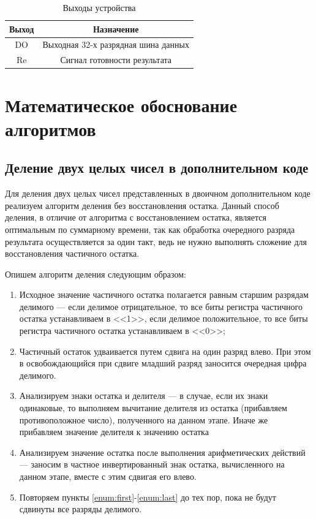\documentclass[a4paper,14pt]{extarticle}
\begin{document}
\begin{table}[h!]
	\centering
	\begin{tabular}{|c|c|}
		\hline
		\multicolumn{1}{|c|}{\textbf{Выход}} & \multicolumn{1}{c|}{\textbf{Назначение}} \\ \hline
		DO & Выходная 32-х разрядная шина данных \\ \hline
		Re & Сигнал готовности результата \\ \hline
	\end{tabular}
	\caption{Выходы устройства}
	\label{tab:outputs}

\end{table} 


\section{Математическое обоснование алгоритмов}
\subsection{Деление двух целых чисел в дополнительном коде}
Для деления двух целых чисел представленных в двоичном дополнительном коде реализуем алгоритм деления без восстановления остатка. Данный способ деления, в отличие от алгоритма с восстановлением остатка, является оптимальным по суммарному времени, так как обработка очередного разряда результата осуществляется за один такт, ведь не нужно выполнять сложение для восстановления частичного остатка.

Опишем алгоритм деления следующим образом:
\begin{enumerate}
	\item \label{enum:first} Исходное значение частичного остатка полагается равным старшим разрядам делимого --- если делимое отрицательное, то все биты регистра частичного остатка устанавливаем в <<1>>, если делимое положительное, то все биты регистра частичного остатка устанавливаем в <<0>>;
	\item Частичный остаток удваивается путем сдвига на один разряд влево. При этом в освобождающийся при сдвиге младший разряд заносится очередная цифра делимого.
	\item Анализируем знаки остатка и делителя --- в случае, если их знаки одинаковые, то выполняем вычитание делителя из остатка (прибавляем противоположное число), полученного на данном этапе. Иначе же прибавляем значение делителя к значению остатка%
	\item \label{enum:last} Анализируем значение остатка после выполнения арифметических действий --- заносим в частное инвертированный знак остатка, вычисленного на данном этапе, вместе с этим сдвигая его влево. 
	\item Повторяем пункты \ref{enum:first}-\ref{enum:last} до тех пор, пока не будут сдвинуты все разряды делимого. 
\end{enumerate}
\end{document}
